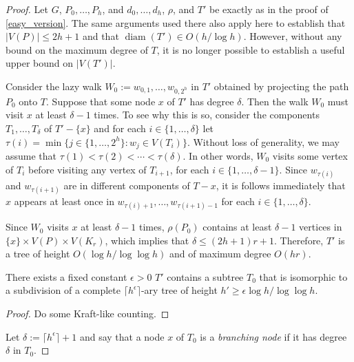 \documentclass{patmorin}
\newcommand{\defin}[1]{\emph{\color{brightmaroon}#1}}
\DeclareMathOperator{\diam}{diam}
\begin{document}

\begin{proof}
  Let $G$, $P_0,\ldots,P_h$, and $d_0,\ldots,d_h$, $\rho$, and $T'$ be exactly as in the proof of \cref{easy_version}.  The same arguments used there also apply here to establish that $|V(P)|\le 2h+1$ and that $\diam(T')\in O(h/\log h)$.  However, without any bound on the maximum degree of $T$, it is no longer possible to establish a useful upper bound on $|V(T')|$.

  Consider the lazy walk $W_0:=w_{0,1},\ldots,w_{0,2^h}$ in $T'$ obtained by projecting the path $P_0$ onto $T$.  Suppose that some node $x$ of $T'$ has degree $\delta$.  Then the walk $W_0$ must visit $x$ at least $\delta-1$ times.  To see why this is so, consider the components $T_1,\ldots,T_\delta$ of $T'-\{x\}$ and for each $i\in\{1,\ldots,\delta\}$ let $\tau(i)=\min\{j\in \{1,\ldots,2^h\}: w_j\in V(T_i)\}$.  Without loss of generality, we may assume that $\tau(1) < \tau(2) <\cdots < \tau(\delta)$.  In other words, $W_0$ visits some vertex of $T_i$ before visiting any vertex of $T_{i+1}$, for each $i\in\{1,\ldots,\delta-1\}$.  Since $w_{\tau(i)}$ and $w_{\tau(i+1)}$ are in different components of $T-x$, it is follows immediately that $x$ appears at least once in $w_{\tau(i)+1},\ldots,w_{\tau(i+1)-1}$ for each $i\in\{1,\ldots,\delta\}$.

  Since $W_0$ visits $x$ at least $\delta-1$ times, $\rho(P_0)$ contains at least $\delta-1$ vertices in $\{x\}\times V(P)\times V(K_r)$, which implies that $\delta \le (2h+1)r + 1$.  Therefore, $T'$ is a tree of height $O(\log h/\log\log h)$ and of maximum degree $O(hr)$.

  \begin{clm}\label{big_logeps_subdivision}
    There exists a fixed constant $\epsilon >0$
    $T'$ contains a subtree $T_0$ that is isomorphic to a subdivision of a complete $\lceil h^\epsilon\rceil$-ary tree of height $h'\ge\epsilon\log h/\log\log h$.
  \end{clm}

  \begin{proof}
    Do some Kraft-like counting.
  \end{proof}

  Let $\delta:=\lceil h^{\epsilon}\rceil+1$ and say that a node $x$ of $T_0$ is a \defin{branching node} if it has degree $\delta$ in $T_0$.


\end{proof}
\end{document}
